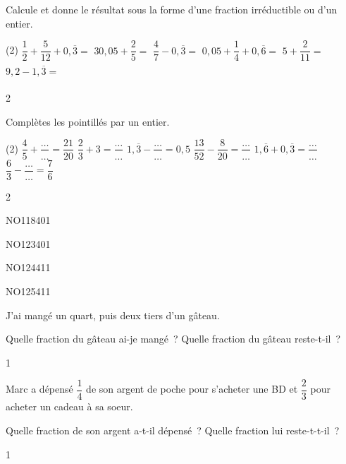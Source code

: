 \documentclass[a4paper,11pt]{report}
\begin{document}
\begin{exo}
{Calcule et donne le résultat sous la forme d'une fraction irréductible ou d'un entier.
	\begin{tasks}(2)
\task $\dfrac{1}{2}+\dfrac{5}{12}+0,\overline{3}=$
\task $30,05+\dfrac{2}{5}=$
\task $\dfrac{4}{7}-0,\overline{3}=$
\task $0,05+\dfrac{1}{4}+0,\overline{6}=$
\task $5+\dfrac{2}{11}=$
\task $9,2-1,\overline{3}=\phantom{\dfrac{1}{5}}$
\end{tasks}}
{2}
\end{exo}

\newpage

\begin{exo}
{Complètes les pointillés par un entier.

\begin{tasks}(2)
\task  $\dfrac{4}{5}+\dfrac{\ldots}{\ldots}=\dfrac{21}{20}$
\task $\dfrac{2}{3}+3=\dfrac{\ldots}{\ldots}$
\task $1,\overline{3}-\dfrac{\ldots}{\ldots}=0,5$
\task  $\dfrac{13}{52}-\dfrac{8}{20}=\dfrac{\ldots}{\ldots}$
\task  $1,\overline{6}+0,\overline{3}=\dfrac{\ldots}{\ldots}\phantom{\dfrac{1}{2}}$
\task $\dfrac{6}{3}-\dfrac{\ldots}{\ldots}=\dfrac{7}{6}$
\end{tasks}
}
{2}
\end{exo}

\begin{exof}{NO118}{40}{1}
\end{exof}
\begin{exof}{NO123}{40}{1}
\end{exof}
\begin{exof}{NO124}{41}{1}
\end{exof}
\begin{exof}{NO125}{41}{1}
\end{exof}


\begin{exo}
{J'ai mangé un quart, puis deux tiers d'un gâteau. 
\begin{tasks}[after-item-skip = 0.2em]
    \task Quelle fraction du gâteau ai-je mangé~?
    \task Quelle fraction du gâteau reste-t-il~?
\end{tasks}}
{1}
\end{exo}

\begin{exo}
{\vspace{0.5em}

	Marc a dépensé $\dfrac{1}{4}$ de son argent de poche pour s'acheter une BD et $\dfrac{2}{3}$ pour acheter un cadeau à sa soeur.


\begin{tasks}[after-item-skip = 0.2em]
    \task Quelle fraction de son argent a-t-il dépensé~?
    \task Quelle fraction lui reste-t-t-il~?
\end{tasks}}
{1}
\end{exo}
\end{document}

